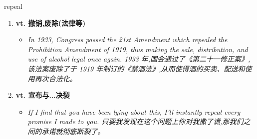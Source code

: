 
\begin{frame}
{\huge repeal}
\begin{center}
\begin{enumerate}\Large
  \item \textbf{vt. 撤销,废除(法律等)}
  \begin{itemize}
    \item \em{\Large{In 1933, Congress passed the 21st Amendment which repealed the Prohibition Amendment of 1919, thus making the sale, distribution, and use of alcohol legal once again. 1933 年,国会通过了《第二十一修正案》,该法案废除了于 1919 年制订的《禁酒法》,从而使得酒的买卖、配送和使用再次合法化。}}
  \end{itemize}
  \item \textbf{vt. 宣布与...决裂}
  \begin{itemize}
    \item \em{\Large{If I find that you have been lying about this, I'll instantly repeal every promise I made to you. 只要我发现在这个问题上你对我撒了谎,那我们之间的承诺就彻底断裂了。}}
  \end{itemize}
\end{enumerate}
\end{center}
\end{frame}
